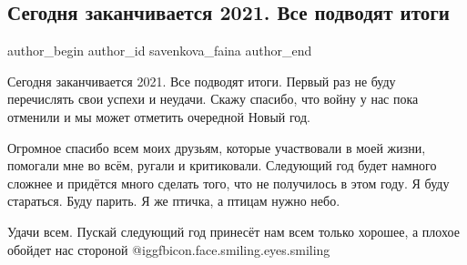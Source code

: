  
 
 
 
 
 
\subsection{Сегодня заканчивается 2021. Все подводят итоги}
\label{sec:31_12_2021.fb.savenkova_faina.1.itogi_god_ptichka}
 
\ifcmt
 author_begin
   author_id savenkova_faina
 author_end
\fi



\begingroup
\Large
Сегодня заканчивается 2021. Все подводят итоги. Первый раз не буду перечислять
свои успехи и неудачи. Скажу спасибо, что войну у нас пока отменили и мы может
отметить очередной Новый год. 
\medskip\par
Огромное спасибо всем моих друзьям, которые
участвовали в моей жизни, помогали мне во всём, ругали и критиковали. Следующий
год будет намного сложнее и придётся много сделать того, что не получилось в
этом году. Я буду стараться. Буду парить. Я же птичка, а птицам нужно небо.
\medskip\par
Удачи всем. Пускай следующий год принесёт нам всем только хорошее, а плохое
обойдет нас стороной  @igg{fbicon.face.smiling.eyes.smiling} 
\endgroup

